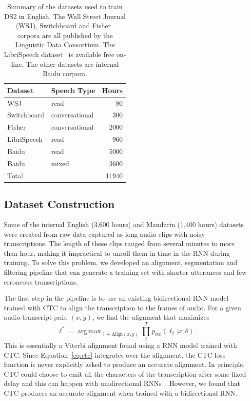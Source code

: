 \documentclass{article}
\DeclareMathOperator*{\argmax}{arg\,max}
\begin{document}
\begin{table}
\centering
\begin{tabular}{l l r}
 \toprule
 Dataset & Speech Type & Hours \\
 \midrule
 WSJ          & read           &   80  \\
 Switchboard  & conversational &  300  \\
 Fisher       & conversational & 2000  \\
 LibriSpeech  & read           &  960  \\
 Baidu        & read           & 5000  \\
 Baidu        & mixed          & 3600  \\
 \midrule
 Total       &                &  11940 \\
 \bottomrule
\end{tabular}
\caption{Summary of the datasets used to train DS2 in English. The Wall Street Journal (WSJ), Switchboard and Fisher~\cite{cieri2004Fisher} corpora are all published by the Linguistic Data Consortium. The LibriSpeech dataset~\cite{panayotov2015} is available free on-line. The other datasets are internal Baidu corpora.}
\label{table:englishdata}
\end{table}


\subsection{Dataset Construction}
\label{subsection:dataconstruct}

Some of the internal English (3,600 hours) and Mandarin (1,400 hours) datasets were created from raw data captured as long audio clips with noisy transcriptions. The length of these clips ranged from several minutes to more than hour, making it impractical to unroll them in time in the RNN during training. To solve this problem, we developed an alignment, segmentation and filtering pipeline that can generate a training set with shorter utterances and few erroneous transcriptions.

The first step in the pipeline is to use an existing bidirectional RNN model trained with CTC to align the transcription to the frames of audio. For a given audio-transcript pair, $(x, y)$, we find the alignment that maximizes
\begin{equation}
\ell^* = \argmax_{\ell \in \text{Align}(x,y)} \prod_t^T p_{\text{ctc}}(\ell_t | x; \theta).
\end{equation}
This is essentially a Viterbi alignment found using a RNN model trained with CTC. Since Equation~\ref{eq:ctc} integrates over the alignment, the CTC loss function is never explicitly asked to produce an accurate alignment. In principle, CTC could choose to emit all the characters of the transcription after some fixed delay and this can happen with unidirectional RNNs~\cite{sak2015}. However, we found that CTC produces an accurate alignment when trained with a bidirectional RNN.
\end{document}
